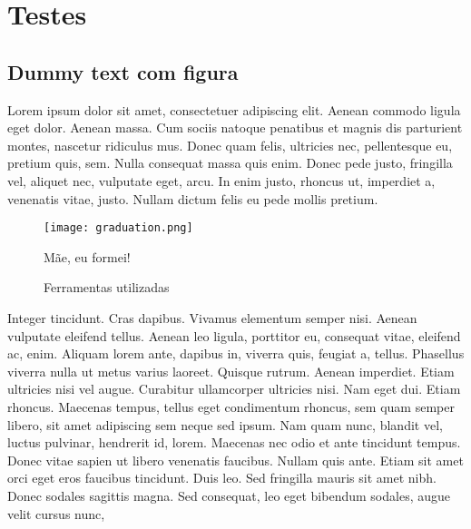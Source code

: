 \chapter{Testes}  
\label{chap: testes}

\section{Dummy text com figura}

Lorem ipsum dolor sit amet, consectetuer adipiscing elit. Aenean commodo ligula eget dolor. Aenean massa. Cum sociis natoque penatibus et magnis dis parturient montes, nascetur ridiculus mus. Donec quam felis, ultricies nec, pellentesque eu, pretium quis, sem. Nulla consequat massa quis enim. Donec pede justo, fringilla vel, aliquet nec, vulputate eget, arcu. In enim justo, rhoncus ut, imperdiet a, venenatis vitae, justo. Nullam dictum felis eu pede mollis pretium.

\begin{figure}[ht]
  \caption{Mãe, eu formei!}
  \label{fig: fig1}
  \centering
  \texttt{[image: graduation.png]}
  
\end{figure}

\begin{figure}[ht]
  \caption{Ferramentas utilizadas}
  \label{fig: fig2}
  \centering
  \hfill
  \hfill
  
\end{figure}

Integer tincidunt. Cras dapibus. Vivamus elementum semper nisi. Aenean vulputate eleifend tellus. Aenean leo ligula, porttitor eu, consequat vitae, eleifend ac, enim. Aliquam lorem ante, dapibus in, viverra quis, feugiat a, tellus. Phasellus viverra nulla ut metus varius laoreet. Quisque rutrum. Aenean imperdiet. Etiam ultricies nisi vel augue. Curabitur ullamcorper ultricies nisi. Nam eget dui. Etiam rhoncus. Maecenas tempus, tellus eget condimentum rhoncus, sem quam semper libero, sit amet adipiscing sem neque sed ipsum. Nam quam nunc, blandit vel, luctus pulvinar, hendrerit id, lorem. Maecenas nec odio et ante tincidunt tempus. Donec vitae sapien ut libero venenatis faucibus. Nullam quis ante. Etiam sit amet orci eget eros faucibus tincidunt. Duis leo. Sed fringilla mauris sit amet nibh. Donec sodales sagittis magna. Sed consequat, leo eget bibendum sodales, augue velit cursus nunc,


